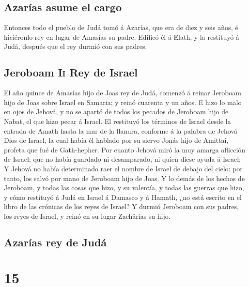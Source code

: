 \hypertarget{azaruxedas-asume-el-cargo}{%
\subsection{Azarías asume el cargo}\label{azaruxedas-asume-el-cargo}}

 Entonces todo el pueblo de Judá tomó á Azarías, que era
de diez y seis años, é hiciéronlo rey en lugar de Amasías su padre.
 Edificó él á Elath, y la restituyó á Judá, después que
el rey durmió con sus padres.

\hypertarget{jeroboam-ii-rey-de-israel}{%
\subsection{\texorpdfstring{Jeroboam \textsc{Ii} Rey de
Israel}{Jeroboam Ii Rey de Israel}}\label{jeroboam-ii-rey-de-israel}}

 El año quince de Amasías hijo de Joas rey de Judá,
comenzó á reinar Jeroboam hijo de Joas sobre Israel en Samaria; y reinó
cuarenta y un años.  E hizo lo malo en ojos de Jehová, y
no se apartó de todos los pecados de Jeroboam hijo de Nabat, el que hizo
pecar á Israel.  El restituyó los términos de Israel
desde la entrada de Amath hasta la mar de la llanura, conforme á la
palabra de Jehová Dios de Israel, la cual había él hablado por su siervo
Jonás hijo de Amittai, profeta que fué de Gath-hepher. 
Por cuanto Jehová miró la muy amarga aflicción de Israel; que no había
guardado ni desamparado, ni quien diese ayuda á Israel; 
Y Jehová no había determinado raer el nombre de Israel de debajo del
cielo: por tanto, los salvó por mano de Jeroboam hijo de Joas.
 Y lo demás de los hechos de Jeroboam, y todas las cosas
que hizo, y su valentía, y todas las guerras que hizo, y cómo restituyó
á Judá en Israel á Damasco y á Hamath, ¿no está escrito en el libro de
las crónicas de los reyes de Israel?  Y durmió Jeroboam
con sus padres, los reyes de Israel, y reinó en su lugar Zachârías su
hijo.

\hypertarget{azaruxedas-rey-de-juduxe1}{%
\subsection{Azarías rey de Judá}\label{azaruxedas-rey-de-juduxe1}}

\hypertarget{section-14}{%
\section{15}\label{section-14}}

